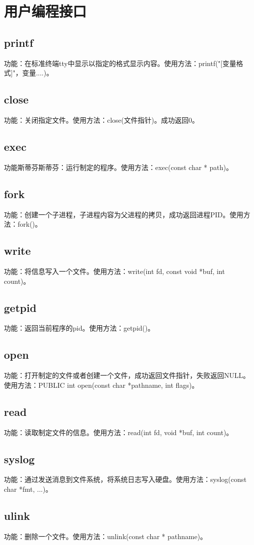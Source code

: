 \documentclass[UTF8,nofonts,cs4size]{ctexrep}
\begin{document}
\chapter{用户编程接口}
\section{printf}
功能：在标准终端tty中显示以指定的格式显示内容。使用方法：printf("[变量格式]"，变量....)。
\section{close}
功能：关闭指定文件。使用方法：close(文件指针)。成功返回0。
\section{exec}
功能斯蒂芬斯蒂芬：运行制定的程序。使用方法：exec(const char * path)。
\section{fork}
功能：创建一个子进程，子进程内容为父进程的拷贝，成功返回进程PID。使用方法：fork()。
\section{write}
功能：将信息写入一个文件。使用方法：write(int fd, const void *buf, int count)。
\section{getpid}
功能：返回当前程序的pid。使用方法：getpid()。
\section{open}
功能：打开制定的文件或者创建一个文件，成功返回文件指针，失败返回NULL。使用方法：PUBLIC int open(const char *pathname, int flags)。
\section{read}
功能：读取制定文件的信息。使用方法：read(int fd, void *buf, int count)。
\section{syslog}
功能：通过发送消息到文件系统，将系统日志写入硬盘。使用方法：syslog(const char *fmt, ...)。
\section{ulink}
功能：删除一个文件。使用方法：unlink(const char * pathname)。
\end{document}
